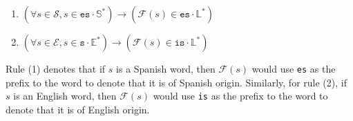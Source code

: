 \begin{enumerate}
    \item \(\left(\forall s \in \mathcal{S}, s \in \texttt{es}\cdot\mathbb{S}^* \right) \rightarrow \left(\mathcal{F}(s) \in \texttt{es}\cdot\mathbb{L}^* \right)\)
    \item \(\left(\forall s \in \mathcal{E}, s \in \texttt{s}\cdot\mathbb{E}^* \right) \rightarrow  \left(\mathcal{F}(s) \in \texttt{is}\cdot\mathbb{L}^* \right)\)
\end{enumerate}

Rule (1) denotes that if \(s\) is a Spanish word, then \(\mathcal{F}(s)\)
would use \texttt{es} as the prefix to the word to denote that it is of Spanish origin.
Similarly, for rule (2), if \(s\) is an English word, then \(\mathcal{F}(s)\)
would use \texttt{is} as the prefix to the word to denote that it is of English origin.

